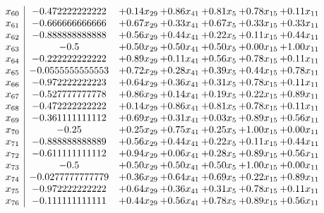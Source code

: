\documentclass[8pt]{article}
\begin{document}
\[\begin{array}{c| c c@{\hskip 2pt} c@{\hskip 2pt} c@{\hskip 2pt} c@{\hskip 2pt} c@{\hskip 2pt} }
 x_{60}   &  -0.472222222222 & +  0.14 x_{29} & +  0.86 x_{41} & +  0.81 x_{5} & +  0.78 x_{15} & +  0.11 x_{11}\\
 x_{61}   &  -0.666666666666 & +  0.67 x_{29} & +  0.33 x_{41} & +  0.67 x_{5} & +  0.33 x_{15} & +  0.33 x_{11}\\
 x_{62}   &  -0.888888888888 & +  0.56 x_{29} & +  0.44 x_{41} & +  0.22 x_{5} & +  0.11 x_{15} & +  0.44 x_{11}\\
 x_{63}   &  -0.5 & +  0.50 x_{29} & +  0.50 x_{41} & +  0.50 x_{5} & +  0.00 x_{15} & +  1.00 x_{11}\\
 x_{64}   &  -0.222222222222 & +  0.89 x_{29} & +  0.11 x_{41} & +  0.56 x_{5} & +  0.78 x_{15} & +  0.11 x_{11}\\
 x_{65}   &  -0.0555555555553 & +  0.72 x_{29} & +  0.28 x_{41} & +  0.39 x_{5} & +  0.44 x_{15} & +  0.78 x_{11}\\
 x_{66}   &  -0.972222222223 & +  0.64 x_{29} & +  0.36 x_{41} & +  0.31 x_{5} & +  0.78 x_{15} & +  0.11 x_{11}\\
 x_{67}   &  -0.527777777778 & +  0.86 x_{29} & +  0.14 x_{41} & +  0.19 x_{5} & +  0.22 x_{15} & +  0.89 x_{11}\\
 x_{68}   &  -0.472222222222 & +  0.14 x_{29} & +  0.86 x_{41} & +  0.81 x_{5} & +  0.78 x_{15} & +  0.11 x_{11}\\
 x_{69}   &  -0.361111111112 & +  0.69 x_{29} & +  0.31 x_{41} & +  0.03 x_{5} & +  0.89 x_{15} & +  0.56 x_{11}\\
 x_{70}   &  -0.25 & +  0.25 x_{29} & +  0.75 x_{41} & +  0.25 x_{5} & +  1.00 x_{15} & +  0.00 x_{11}\\
 x_{71}   &  -0.888888888889 & +  0.56 x_{29} & +  0.44 x_{41} & +  0.22 x_{5} & +  0.11 x_{15} & +  0.44 x_{11}\\
 x_{72}   &  -0.611111111112 & +  0.94 x_{29} & +  0.06 x_{41} & +  0.28 x_{5} & +  0.89 x_{15} & +  0.56 x_{11}\\
 x_{73}   &  -0.5 & +  0.50 x_{29} & +  0.50 x_{41} & +  0.50 x_{5} & +  1.00 x_{15} & +  0.00 x_{11}\\
 x_{74}   &  -0.0277777777779 & +  0.36 x_{29} & +  0.64 x_{41} & +  0.69 x_{5} & +  0.22 x_{15} & +  0.89 x_{11}\\
 x_{75}   &  -0.972222222222 & +  0.64 x_{29} & +  0.36 x_{41} & +  0.31 x_{5} & +  0.78 x_{15} & +  0.11 x_{11}\\
 x_{76}   &  -0.111111111111 & +  0.44 x_{29} & +  0.56 x_{41} & +  0.78 x_{5} & +  0.89 x_{15} & +  0.56 x_{11}\\

\end{array}\]
\end{document}
